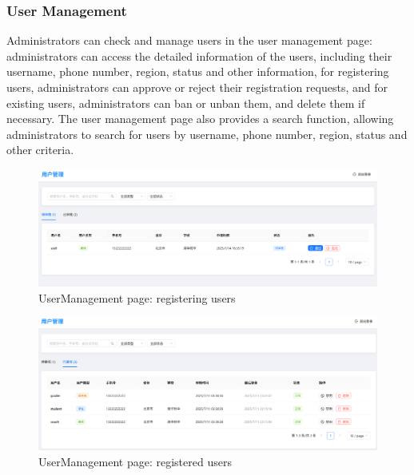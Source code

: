 \documentclass[12pt]{article}
\begin{document}
\subsubsection{User Management}
Administrators can check and manage users in the user management page: administrators can access the detailed information of
the users, including their username, phone number, region, status and other information,
for registering users, administrators can approve or reject their registration requests, and for existing users, administrators can ban or unban them,
and delete them if necessary.
The user management page also provides a search function, allowing administrators to search for users by username, phone number, region,
status and other criteria.
\begin{figure}[H]
    \centering
    \includegraphics[width=\textwidth]{admin/usermanage-1.png}
    \caption{UserManagement page: registering users}
    \label{fig:UserManagement page}
\end{figure}
\begin{figure}[H]
    \centering
    \includegraphics[width=\textwidth]{admin/usermanage-2.png}
    \caption{UserManagement page: registered users}
    \label{fig:UserManagement page}
\end{figure}
\end{document}
